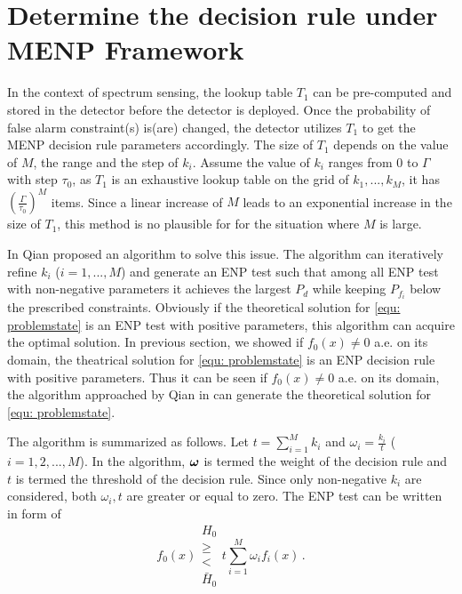 
\section{Determine the decision rule under MENP Framework}
In the context of spectrum sensing, the lookup table $T_1$ can be pre-computed and stored in the detector before the detector is deployed. Once the probability of false alarm constraint(s) is(are) changed, the detector utilizes $T_1$ to get the MENP decision  rule parameters accordingly. The size of $T_1$ depends on the value of $M$, the range and the step of $k_i$.  Assume the value of $k_i$ ranges from $0$ to $\Gamma$ with step $\tau_0$, as $T_1$ is an exhaustive lookup table on the grid of $k_1, ..., k_M$, it has $(\frac{\Gamma}{\tau_0})^M$ items. Since a linear increase of $M$ leads to an exponential increase in the size of $T_1$, this method is no plausible for for the situation where $M$ is large. 

In \cite{zhang1999design, zhang2000efficient} Qian proposed an algorithm to solve this issue.  The algorithm can iteratively refine $k_i$ ($i=1, ..., M$) and generate an ENP test  such that among all ENP test with non-negative parameters it achieves the largest $P_d$ while keeping $P_{f_i}$ below the prescribed constraints. 
Obviously if the theoretical solution for \eqref{equ: problemstate} is an ENP test with positive parameters, this algorithm can acquire the optimal solution. 
In previous section, we showed if $f_0(x) \neq 0$ a.e. on its domain,  the theatrical solution for \eqref{equ: problemstate} is an ENP decision rule with positive parameters.
Thus it can be seen if $f_0(x) \neq 0$ a.e. on its domain, the algorithm approached by Qian in \cite{zhang1999design, zhang2000efficient} can generate the theoretical solution for \eqref{equ: problemstate}.

The algorithm is summarized as follows. Let $t = \sum_{i=1}^{M}k_i$ and $\omega_i = \frac{k_i}{t}$ ($i=1, 2, ..., M$). In the algorithm, $\boldsymbol{\omega}$ is termed the weight of the decision rule and $t$ is termed the threshold of the decision rule. Since only non-negative $k_i$ are considered, both $\omega_i, t$ are greater or equal to zero. The ENP test can be written in form of 
\begin{equation}
\label{qian dec}
f_0(x) \substack{H_0 \\ \geq \\ < \\ \bar{H}_0} t\sum_{i=1}^{M}\omega_if_i(x)\,.
\end{equation}

